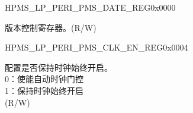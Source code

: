 \begin{register}{H}{PMS\_LP\_PERI\_PMS\_DATE\_REG}{0x0000}\label{regdesc:PMSLPPERIPMSDATEREG}
%
\regnewline%
\begin{regdesc}\begin{reglist}
\label{fielddesc:PMSLPPERIPMSDATE}\item [PMS\_LP\_PERI\_PMS\_DATE] 版本控制寄存器。(R/W)
\end{reglist}\end{regdesc}
\end{register}


\begin{register}{H}{PMS\_LP\_PERI\_PMS\_CLK\_EN\_REG}{0x0004}\label{regdesc:PMSLPPERIPMSCLKENREG}
%
%
\regnewline%
\begin{regdesc}\begin{reglist}
\label{fielddesc:PMSLPPERIPMSCLKEN}\item [PMS\_LP\_PERI\_PMS\_CLK\_EN] 配置是否保持时钟始终开启。\\
0：使能自动时钟门控 \\
1：保持时钟始终开启 \\
(R/W)
\end{reglist}\end{regdesc}
\end{register}


